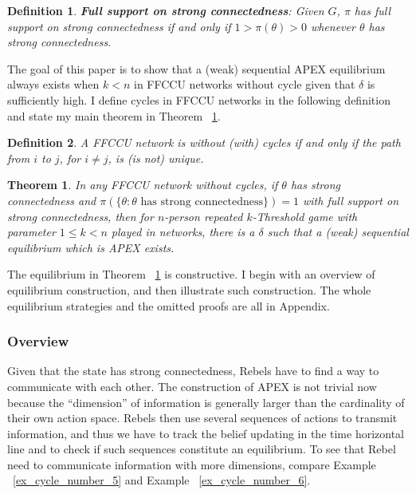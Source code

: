 \documentclass[12pt,letter]{article}
\newtheorem{theorem}{Theorem}
\newtheorem{definition}{Definition}[section]
\theoremstyle{definition}
\theoremstyle{remark}
\theoremstyle{claim}
\begin{document}
\begin{definition}
\textbf{Full support on strong connectedness}: Given $G$, $\pi$ has full support on strong connectedness if and only if $1>\pi(\theta)>0$ whenever $\theta$ has strong connectedness.
\end{definition}  


The goal of this paper is to show that a (weak) sequential APEX equilibrium always exists when $k<n$ in FFCCU networks without cycle given that $\delta$ is sufficiently high. I define cycles in FFCCU networks in the following definition and state my main theorem in Theorem ~\ref{thm_main_result}. 
\begin{definition}
A FFCCU network is without (with) cycles if and only if the path from $i$ to $j$, for $i\neq j$, is (is not) unique. 
\end{definition}

\begin{theorem}
\label{thm_main_result}
In any FFCCU network without cycles, if $\theta$ has strong connectedness and $\pi(\{\theta: \theta\text{ has strong connectedness}\})=1$ with full support on strong connectedness, then for $n$-person repeated $k$-Threshold game with parameter $1\leq k < n$ played in networks, there is a $\delta$ such that a (weak) sequential equilibrium which is APEX exists.
\end{theorem}

The equilibrium in Theorem ~\ref{thm_main_result} is constructive. I begin with an overview of equilibrium construction, and then illustrate such construction. The whole equilibrium strategies and the omitted proofs are all in Appendix.  

\subsubsection{Overview}

Given that the state has strong connectedness, Rebels have to find a way to communicate with each other. The construction of APEX is not trivial now because the ``dimension'' of information is generally larger than the cardinality of their own action space. Rebels then use several sequences of actions to transmit information, and thus we have to track the belief updating in the time horizontal line and to check if such sequences constitute an equilibrium. To see that Rebel need to communicate information with more dimensions, compare Example ~\ref{ex_cycle_number_5} and Example ~\ref{ex_cycle_number_6}.
\end{document}
